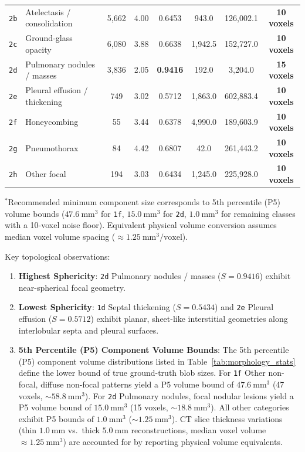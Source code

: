 \documentclass[11pt,a4paper]{article}
\begin{document}
\begin{table}[htbp]
\begin{tabularx}{\linewidth}{c >{\raggedright\arraybackslash}X c c c c c c}
\texttt{2b} & Atelectasis / consolidation & 5,662 & 4.00 & 0.6453 & 943.0 & 126,002.1 & \textbf{10 voxels} \\
\texttt{2c} & Ground-glass opacity & 6,080 & 3.88 & 0.6638 & 1,942.5 & 152,727.0 & \textbf{10 voxels} \\
\texttt{2d} & Pulmonary nodules / masses & 3,836 & 2.05 & \textbf{0.9416} & 192.0 & 3,204.0 & \textbf{15 voxels} \\
\texttt{2e} & Pleural effusion / thickening & 749 & 3.02 & 0.5712 & 1,863.0 & 602,883.4 & \textbf{10 voxels} \\
\texttt{2f} & Honeycombing & 55 & 3.44 & 0.6378 & 4,990.0 & 189,603.9 & \textbf{10 voxels} \\
\texttt{2g} & Pneumothorax & 84 & 4.42 & 0.6807 & 42.0 & 261,443.2 & \textbf{10 voxels} \\
\texttt{2h} & Other focal & 194 & 3.03 & 0.6434 & 1,245.0 & 225,928.0 & \textbf{10 voxels} \\
\bottomrule
\end{tabularx}

\vspace{2mm}
\raggedright \scriptsize $^*$Recommended minimum component size corresponds to 5th percentile (P5) volume bounds ($47.6~\text{mm}^3$ for \texttt{1f}, $15.0~\text{mm}^3$ for \texttt{2d}, $1.0~\text{mm}^3$ for remaining classes with a 10-voxel noise floor). Equivalent physical volume conversion assumes median voxel volume spacing ($\approx 1.25~\text{mm}^3/\text{voxel}$).
\end{table}

Key topological observations:
\begin{enumerate}
    \item \textbf{Highest Sphericity}: \texttt{2d} Pulmonary nodules / masses ($S = 0.9416$) exhibit near-spherical focal geometry.
    \item \textbf{Lowest Sphericity}: \texttt{1d} Septal thickening ($S = 0.5434$) and \texttt{2e} Pleural effusion ($S = 0.5712$) exhibit planar, sheet-like interstitial geometries along interlobular septa and pleural surfaces.
    \item \textbf{5th Percentile (P5) Component Volume Bounds}: The 5th percentile (P5) component volume distributions listed in Table~\ref{tab:morphology_stats} define the lower bound of true ground-truth blob sizes. For \texttt{1f} Other non-focal, diffuse non-focal patterns yield a P5 volume bound of $47.6~\text{mm}^3$ (47 voxels, $\sim 58.8~\text{mm}^3$). For \texttt{2d} Pulmonary nodules, focal nodular lesions yield a P5 volume bound of $15.0~\text{mm}^3$ (15 voxels, $\sim 18.8~\text{mm}^3$). All other categories exhibit P5 bounds of $1.0~\text{mm}^3$ ($\sim 1.25~\text{mm}^3$). CT slice thickness variations (thin $1.0~\text{mm}$ vs.\ thick $5.0~\text{mm}$ reconstructions, median voxel volume $\approx 1.25~\text{mm}^3$) are accounted for by reporting physical volume equivalents.
\end{enumerate}
\end{document}
